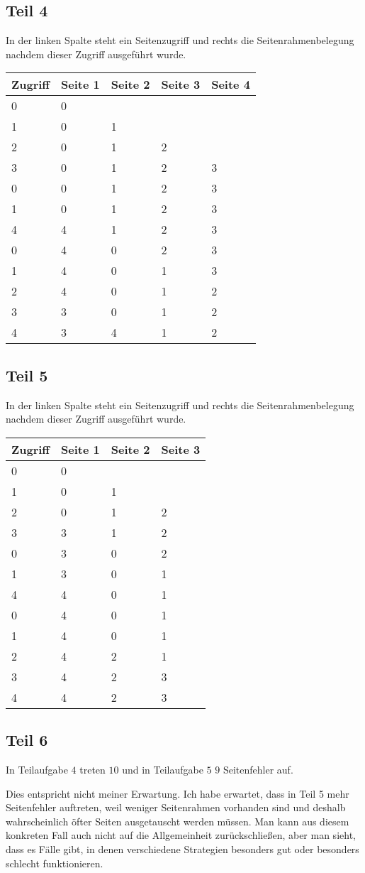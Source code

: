 \documentclass[10pt,a4paper]{article}
\begin{document}
\subsection*{Teil 4}

In der linken Spalte steht ein Seitenzugriff und rechts die Seitenrahmenbelegung nachdem dieser Zugriff ausgeführt wurde.

\begin{tabular}{|l|l|l|l|l|}
\hline
Zugriff & Seite 1 & Seite 2 & Seite 3 & Seite 4\\
\hline
0 & 0 &  &  & \\
1 & 0 & 1 &  & \\
2 & 0 & 1 & 2 & \\
3 & 0 & 1 & 2 & 3\\
0 & 0 & 1 & 2 & 3\\
1 & 0 & 1 & 2 & 3\\
4 & 4 & 1 & 2 & 3\\
0 & 4 & 0 & 2 & 3\\
1 & 4 & 0 & 1 & 3\\
2 & 4 & 0 & 1 & 2\\
3 & 3 & 0 & 1 & 2\\
4 & 3 & 4 & 1 & 2
\end{tabular}

\subsection*{Teil 5}

In der linken Spalte steht ein Seitenzugriff und rechts die Seitenrahmenbelegung nachdem dieser Zugriff ausgeführt wurde.

\begin{tabular}{|l|l|l|l|}
\hline
Zugriff & Seite 1 & Seite 2 & Seite 3\\
\hline
0 & 0 &  & \\
1 & 0 & 1 & \\
2 & 0 & 1 & 2\\
3 & 3 & 1 & 2\\
0 & 3 & 0 & 2\\
1 & 3 & 0 & 1\\
4 & 4 & 0 & 1\\
0 & 4 & 0 & 1\\
1 & 4 & 0 & 1\\
2 & 4 & 2 & 1\\
3 & 4 & 2 & 3\\
4 & 4 & 2 & 3
\end{tabular}

\subsection*{Teil 6}

In Teilaufgabe $4$ treten $10$ und in Teilaufgabe $5$ $9$ Seitenfehler auf.

Dies entspricht nicht meiner Erwartung.
Ich habe erwartet, dass in Teil 5 mehr Seitenfehler auftreten, weil weniger Seitenrahmen vorhanden sind und deshalb wahrscheinlich öfter Seiten ausgetauscht werden müssen.
Man kann aus diesem konkreten Fall auch nicht auf die Allgemeinheit zurückschließen, aber man sieht, dass es Fälle gibt, in denen verschiedene Strategien besonders gut oder besonders schlecht funktionieren.
\end{document}
